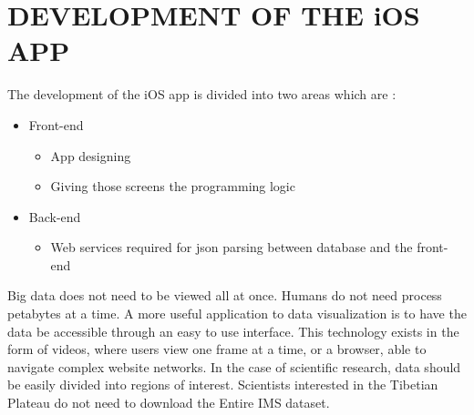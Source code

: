 \chapter{DEVELOPMENT OF THE iOS APP}
\label{chap:development of the app}

The development of the iOS app is divided into two areas which are :

\begin{itemize}
    \item Front-end
        \begin{itemize}
            \item App designing
            \item Giving those screens the programming logic
        \end{itemize}

    \item Back-end
        \begin{itemize}
            \item Web services required for \gls{json} parsing between database and the front-end
    \end{itemize}
\end{itemize}


Big data does not need to be viewed all at once. Humans do not need process petabytes at a time. A more useful application to data visualization is to have the data be accessible through an easy to use interface. This technology exists in the form of videos, where users view one frame at a time, or a browser, able to navigate complex website networks. In the case of scientific research, data should be easily divided into regions of interest. Scientists interested in the Tibetian Plateau do not need to download the Entire IMS dataset.

